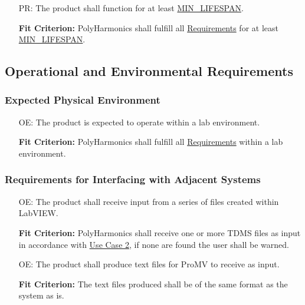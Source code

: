\documentclass[12pt]{article}
\newcounter{perfnum}
\newcounter{oaenum}
\newcommand{\progname}{PolyHarmonics}
\begin{document}
\noindent \begin{itemize} 
\item[PR\refstepcounter{perfnum}\theperfnum\label{NF_LG}:] The product shall
  function for at least \hyperref[AppendA]{MIN\_LIFESPAN}.

\textbf{Fit Criterion:} \progname{} shall fulfill all 
\hyperref[Func]{Requirements} for at least\\ \hyperref[AppendA]{MIN\_LIFESPAN}.
\end{itemize}

\subsection{Operational and Environmental Requirements}

\subsubsection{Expected Physical Environment}

\noindent \begin{itemize}
\item[OE\refstepcounter{oaenum}\theoaenum\label{NF_PE}:] The product is expected
  to operate within a lab environment.

  \textbf{Fit Criterion:} \progname{} shall fulfill all 
  \hyperref[Func]{Requirements} within a lab environment.


\end{itemize}

\subsubsection{Requirements for Interfacing with Adjacent Systems}

\noindent \begin{itemize}
\item[OE\refstepcounter{oaenum}\theoaenum\label{NF_AS1}:] The product shall
  receive input from a series of files created within LabVIEW.

  \textbf{Fit Criterion:} \progname{} shall receive one or more TDMS files as 
input in accordance with \hyperref[UseCase]{Use Case 2}, if none are found
 the user shall be warned.

\item[OE\refstepcounter{oaenum}\theoaenum\label{NF_AS2}:] The product shall
  produce text files for ProMV to receive as input.

  \textbf{Fit Criterion:} The text files produced shall be of the same format as 
the system as is.
\end{itemize}
\end{document}
